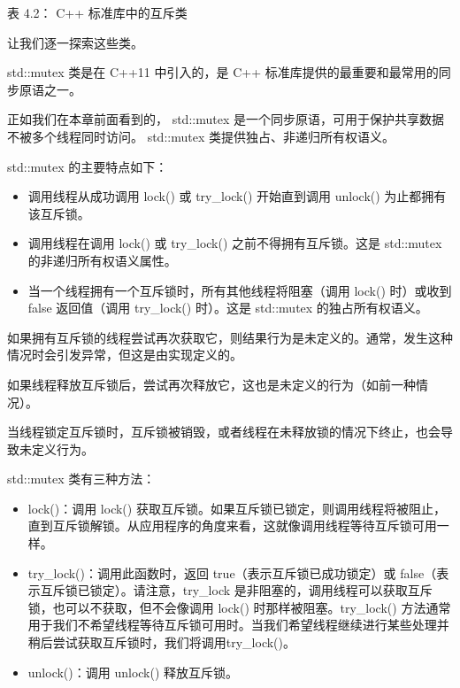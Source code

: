 \begin{center}
表 4.2： C++ 标准库中的互斥类
\end{center}

让我们逐一探索这些类。


std::mutex 类是在 C++11 中引入的，是 C++ 标准库提供的最重要和最常用的同步原语之一。

正如我们在本章前面看到的， std::mutex 是一个同步原语，可用于保护共享数据不被多个线程同时访问。
std::mutex 类提供独占、非递归所有权语义。

std::mutex 的主要特点如下：

\begin{itemize}
\item
调用线程从成功调用 lock() 或 try\_lock() 开始直到调用 unlock() 为止都拥有该互斥锁。

\item
调用线程在调用 lock() 或 try\_lock() 之前不得拥有互斥锁。这是 std::mutex 的非递归所有权语义属性。

\item
当一个线程拥有一个互斥锁时，所有其他线程将阻塞（调用 lock() 时）或收到 false 返回值（调用 try\_lock() 时）。这是 std::mutex 的独占所有权语义。
\end{itemize}

如果拥有互斥锁的线程尝试再次获取它，则结果行为是未定义的。通常，发生这种情况时会引发异常，但这是由实现定义的。

如果线程释放互斥锁后，尝试再次释放它，这也是未定义的行为（如前一种情况）。

当线程锁定互斥锁时，互斥锁被销毁，或者线程在未释放锁的情况下终止，也会导致未定义行为。

std::mutex 类有三种方法：

\begin{itemize}
\item
lock()：调用 lock() 获取互斥锁。如果互斥锁已锁定，则调用线程将被阻止，直到互斥锁解锁。从应用程序的角度来看，这就像调用线程等待互斥锁可用一样。

\item
try\_lock()：调用此函数时，返回 true（表示互斥锁已成功锁定）或 false（表示互斥锁已锁定）。请注意，try\_lock 是非阻塞的，调用线程可以获取互斥锁，也可以不获取，但不会像调用 lock() 时那样被阻塞。try\_lock() 方法通常用于我们不希望线程等待互斥锁可用时。当我们希望线程继续进行某些处理并稍后尝试获取互斥锁时，我们将调用try\_lock()。

\item
unlock()：调用 unlock() 释放互斥锁。
\end{itemize}

